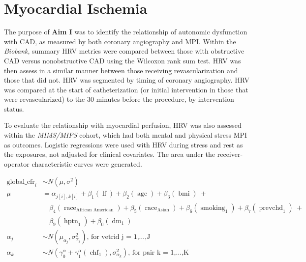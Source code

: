 \documentclass[
  11pt,
  openany]{book}
\begin{document}
\hypertarget{myocardial-ischemia}{%
\section{Myocardial Ischemia}\label{myocardial-ischemia}}

The purpose of \textbf{Aim I} was to identify the relationship of autonomic dysfunction with CAD, as measured by both coronary angiography and MPI.
Within the \emph{Biobank}, summary HRV metrics were compared between those with obstructive CAD versus nonobstructive CAD using the Wilcoxon rank sum test.
HRV was then assess in a similar manner between those receiving revascularization and those that did not.
HRV was segmented by timing of coronary angiography.
HRV was compared at the start of catheterization (or initial intervention in those that were revascularized) to the 30 minutes before the procedure, by intervention status.

To evaluate the relationship with myocardial perfusion, HRV was also assessed within the \emph{MIMS/MIPS} cohort, which had both mental and physical stress MPI as outcomes.
Logistic regressions were used with HRV during stress and rest as the exposures, not adjusted for clinical covariates.
The area under the receiver-operator characteristic curves were generated.

\[
\begin{aligned}
  \operatorname{global\_cfr}_{i}  &\sim N \left(\mu, \sigma^2 \right) \\
    \mu &=\alpha_{j[i],k[i]} + \beta_{1}(\operatorname{lf}) + \beta_{2}(\operatorname{age}) + \beta_{3}(\operatorname{bmi})\ + \\
&\quad \beta_{4}(\operatorname{race}_{\operatorname{African\ American}}) + \beta_{5}(\operatorname{race}_{\operatorname{Asian}}) + \beta_{6}(\operatorname{smoking}_{\operatorname{1}}) + \beta_{7}(\operatorname{prevchd}_{\operatorname{1}})\ + \\
&\quad \beta_{9}(\operatorname{hptn}_{\operatorname{1}}) + \beta_{0}(\operatorname{dm}_{\operatorname{1}}) \\
    \alpha_{j}  &\sim N \left(\mu_{\alpha_{j}}, \sigma^2_{\alpha_{j}} \right)
    \text{, for vetrid j = 1,} \dots \text{,J} \\
    \alpha_{k}  &\sim N \left(\gamma_{0}^{\alpha} + \gamma_{1}^{\alpha}(\operatorname{chf}_{\operatorname{1}}), \sigma^2_{\alpha_{k}} \right)
    \text{, for pair k = 1,} \dots \text{,K}
\end{aligned}
\]
\end{document}
